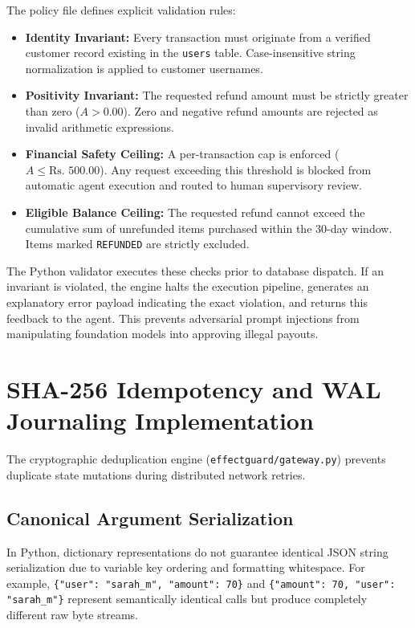 The policy file defines explicit validation rules:
\begin{itemize}
    \item \textbf{Identity Invariant:} Every transaction must originate from a verified customer record existing in the \texttt{users} table. Case-insensitive string normalization is applied to customer usernames.
    \item \textbf{Positivity Invariant:} The requested refund amount must be strictly greater than zero ($A > 0.00$). Zero and negative refund amounts are rejected as invalid arithmetic expressions.
    \item \textbf{Financial Safety Ceiling:} A per-transaction cap is enforced ($A \le \text{Rs.~}500.00$). Any request exceeding this threshold is blocked from automatic agent execution and routed to human supervisory review.
    \item \textbf{Eligible Balance Ceiling:} The requested refund cannot exceed the cumulative sum of unrefunded items purchased within the 30-day window. Items marked \texttt{REFUNDED} are strictly excluded.
\end{itemize}

The Python validator executes these checks prior to database dispatch. If an invariant is violated, the engine halts the execution pipeline, generates an explanatory error payload indicating the exact violation, and returns this feedback to the agent. This prevents adversarial prompt injections from manipulating foundation models into approving illegal payouts.

\section{SHA-256 Idempotency and WAL Journaling Implementation}

The cryptographic deduplication engine (\texttt{effectguard/gateway.py}) prevents duplicate state mutations during distributed network retries.

\subsection{Canonical Argument Serialization}
In Python, dictionary representations do not guarantee identical JSON string serialization due to variable key ordering and formatting whitespace. For example, \texttt{\{"user": "sarah\_m", "amount": 70\}} and \texttt{\{"amount": 70, "user": "sarah\_m"\}} represent semantically identical calls but produce completely different raw byte streams. 

